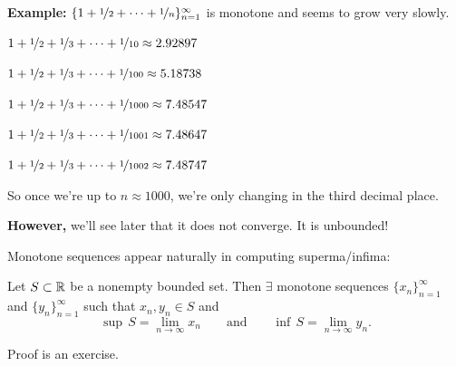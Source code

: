 \documentclass[10pt,aspectratio=149]{beamer}
\begin{document}
\begin{frame}
\textbf{Example:}
$\{ 1 + \nicefrac{1}{2} + \cdots + \nicefrac{1}{n} \}_{n=1}^\infty$ is monotone and seems to grow very
slowly.

\medskip
\pause

$1 + \nicefrac{1}{2} + \nicefrac{1}{3} + \cdots + \nicefrac{1}{10} \approx
2.92897$

\medskip
\pause

$1 + \nicefrac{1}{2} + \nicefrac{1}{3} + \cdots + \nicefrac{1}{100} \approx
5.18738$

\medskip
\pause

$1 + \nicefrac{1}{2} + \nicefrac{1}{3} + \cdots + \nicefrac{1}{1000} \approx
7.48547$

\medskip
\pause

$1 + \nicefrac{1}{2} + \nicefrac{1}{3} + \cdots + \nicefrac{1}{1001} \approx
7.48647$

\medskip
\pause

$1 + \nicefrac{1}{2} + \nicefrac{1}{3} + \cdots + \nicefrac{1}{1002} \approx
7.48747$

\medskip
\pause

So once we're up to $n \approx 1000$, we're only changing in the third
decimal place.

\medskip
\pause

\textbf{However,}
we'll see later that it does not converge.  It is unbounded!

\end{frame}

\begin{frame}
Monotone sequences appear naturally in computing superma/infima:

\pause

\begin{proposition}
Let $S \subset {\mathbb{R}}$ be a nonempty bounded set.
\pause
Then $\exists$ monotone sequences
$\{ x_n \}_{n=1}^\infty$ and $\{ y_n \}_{n=1}^\infty$ such that $x_n, y_n \in S$ and
\begin{equation*}
\sup\,S = \lim_{n\to \infty} x_n \qquad \text{and} \qquad \inf\,S =
\lim_{n\to\infty} y_n .
\end{equation*}
\end{proposition}

\pause

Proof is an exercise.
\end{frame}
\end{document}
